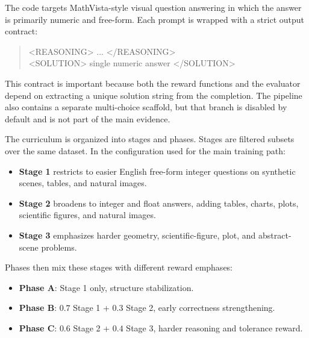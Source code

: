 \documentclass{article} %
\begin{document}
The code targets MathVista-style visual question answering in which the answer is primarily numeric and free-form. Each prompt is wrapped with a strict output contract:
\begin{quote}
\small\ttfamily
<REASONING> ... </REASONING>\\
<SOLUTION> single numeric answer </SOLUTION>
\end{quote}
This contract is important because both the reward functions and the evaluator depend on extracting a unique solution string from the completion. The pipeline also contains a separate multi-choice scaffold, but that branch is disabled by default and is not part of the main evidence.

The curriculum is organized into stages and phases. Stages are filtered subsets over the same dataset. In the configuration used for the main training path:
\begin{itemize}[leftmargin=1.2em]
\item \textbf{Stage 1} restricts to easier English free-form integer questions on synthetic scenes, tables, and natural images.
\item \textbf{Stage 2} broadens to integer and float answers, adding tables, charts, plots, scientific figures, and natural images.
\item \textbf{Stage 3} emphasizes harder geometry, scientific-figure, plot, and abstract-scene problems.
\end{itemize}
Phases then mix these stages with different reward emphases:
\begin{itemize}[leftmargin=1.2em]
\item \textbf{Phase A}: Stage 1 only, structure stabilization.
\item \textbf{Phase B}: $0.7$ Stage 1 + $0.3$ Stage 2, early correctness strengthening.
\item \textbf{Phase C}: $0.6$ Stage 2 + $0.4$ Stage 3, harder reasoning and tolerance reward.
\end{itemize}
\end{document}
